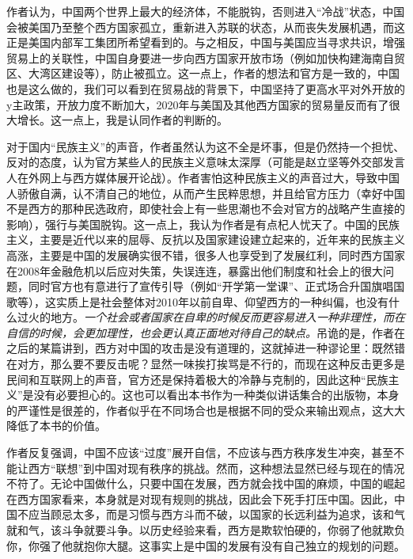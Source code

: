 作者认为，中国两个世界上最大的经济体，不能脱钩，否则进入“冷战”状态，中国会被美国乃至整个西方国家孤立，重新进入苏联的状态，从而丧失发展机遇，而这正是美国内部军工集团所希望看到的。与之相反，中国与美国应当寻求共识，增强贸易上的关联性，中国自身要进一步向西方国家开放市场（例如加快构建海南自贸区、大湾区建设等），防止被孤立。这一点上，作者的想法和官方是一致的，中国也是这么做的，我们可以看到在贸易战的背景下，中国坚持了更高水平对外开放的y主政策，开放力度不断加大，2020年与美国及其他西方国家的贸易量反而有了很大增长。这一点上，我是认同作者的判断的。

对于国内“民族主义”的声音，作者虽然认为这不全是坏事，但是仍然持一个担忧、反对的态度，认为官方某些人的民族主义意味太深厚（可能是赵立坚等外交部发言人在外网上与西方媒体展开论战）。作者害怕这种民族主义的声音过大，导致中国人骄傲自满，认不清自己的地位，从而产生民粹思想，并且给官方压力（幸好中国不是西方的那种民选政府，即使社会上有一些思潮也不会对官方的战略产生直接的影响），强行与美国脱钩。这一点上，我认为作者是有点杞人忧天了。中国的民族主义，主要是近代以来的屈辱、反抗以及国家建设建立起来的，近年来的民族主义高涨，主要是中国的发展确实很不错，很多人也享受到了发展红利，同时西方国家在2008年金融危机以后应对失策，失误连连，暴露出他们制度和社会上的很大问题，同时官方也有意进行了宣传引导（例如“开学第一堂课”、正式场合升国旗唱国歌等），这实质上是社会整体对2010年以前自卑、仰望西方的一种纠偏，也没有什么过火的地方。\emph{一个社会或者国家在自卑的时候反而更容易进入一种非理性，而在自信的时候，会更加理性，也会更认真正面地对待自己的缺点。}吊诡的是，作者在之后的某篇讲到，西方对中国的攻击是没有道理的，这就掉进一种谬论里：既然错在对方，那么要不要反击呢？显然一味挨打挨骂是不行的，而现在这种反击更多是民间和互联网上的声音，官方还是保持着极大的冷静与克制的，因此这种“民族主义”是没有必要担心的。这也可以看出本书作为一种类似讲话集合的出版物，本身的严谨性是很差的，作者似乎在不同场合也是根据不同的受众来输出观点，这大大降低了本书的价值。

作者反复强调，中国不应该“过度”展开自信，不应该与西方秩序发生冲突，甚至不能让西方“联想”到中国对现有秩序的挑战。然而，这种想法显然已经与现在的情况不符了。无论中国做什么，只要中国在发展，西方就会找中国的麻烦，中国的崛起在西方国家看来，本身就是对现有规则的挑战，因此会下死手打压中国。因此，中国不应当顾忌太多，而是习惯与西方斗而不破，以国家的长远利益为追求，该和气就和气，该斗争就要斗争。以历史经验来看，西方是欺软怕硬的，你弱了他就欺负你，你强了他就抱你大腿。这事实上是中国的发展有没有自己独立的规划的问题。

